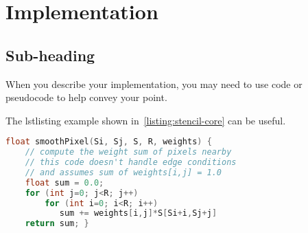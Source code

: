 \chapter{Implementation}

\section{Sub-heading}

When you describe your implementation, you may need to use code or pseudocode to help convey your point.

The lstlisting example shown in~\ref{listing:stencil-core} can be useful.

\begin{lstlisting}[caption={Stencil computation in 2D: performs sum of product of nearby pixels with weights.},label={listing:stencil-core}, name=stencil-core, float=h, style=mystyle,language=C++]
float smoothPixel(Si, Sj, S, R, weights) {
    // compute the weight sum of pixels nearby
    // this code doesn't handle edge conditions
    // and assumes sum of weights[i,j] = 1.0
    float sum = 0.0;
    for (int j=0; j<R; j++)
        for (int i=0; i<R; i++)
           sum += weights[i,j]*S[Si+i,Sj+j]
    return sum; }
\end{lstlisting}


